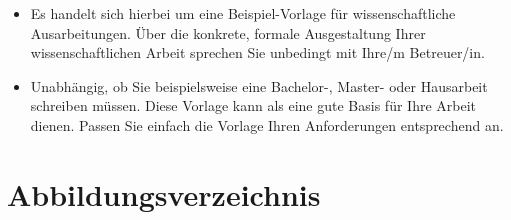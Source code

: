 \documentclass[a4paper,12pt,oneside]{article}
\begin{document}
  \vspace{1cm}
  \begin{tcolorbox}[title={Hinweise zu dieser Dokumentvorlage}]
  \begin{itemize}
   \item Es handelt sich hierbei um eine Beispiel-Vorlage für wissenschaftliche Ausarbeitungen.
Über die konkrete, formale Ausgestaltung Ihrer wissenschaftlichen Arbeit sprechen Sie unbedingt mit Ihre/m Betreuer/in.
  \item Unabhängig, ob Sie beispielsweise eine Bachelor-, Master- oder Hausarbeit schreiben müssen. Diese Vorlage kann als eine gute Basis für Ihre Arbeit dienen. Passen Sie einfach die Vorlage Ihren Anforderungen entsprechend an.
  \end{itemize}
  \end{tcolorbox}
  
  \newpage
  
  \tableofcontents
  
  \newpage
  \pagestyle{fancy} %
 
  \section*{Abbildungsverzeichnis}
  \renewcommand{\listfigurename}{} %
  \thispagestyle{empty}
  \listoffigures
  
  \newpage
  
  
  
  \newpage
  
\end{document}
